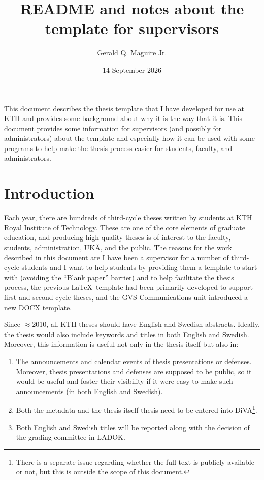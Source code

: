 \documentclass[12pt, twoside]{article}
\title{README and notes about the template for supervisors}
\author{Gerald Q. Maguire Jr.}
\date{14 September 2026}
\newcommand*{\warningExpl}[1]{\todo[inline, backgroundcolor=kth-lightred40]{#1}} %
\begin{document}
\glsresetall[]
\maketitle
{}
\warningExpl{\textbf{This document is a work in progress.}}


This document describes the thesis template that I have developed for use at \gls{KTH} and provides some background about why it is the way that it is. This document provides some information for supervisors (and possibly for administrators) about the template and especially how it can be used with some programs to help make the thesis process easier for students, faculty, and administrators.

\setcounter{page}{1}
\glsresetall
\section{Introduction}
\label{sec:IntroForSupervisors}

Each year, there are hundreds of third-cycle theses written by students at KTH Royal Institute of Technology. These are one of the core elements of graduate education, and producing high-quality theses is of interest to the faculty, students, administration, \foreignlanguage{swedish}{\gls{UKÄ}}, and the public. The reasons for the work described in this document are \first I have been a supervisor for a number of third-cycle students and I want to help students by providing them a template to start with (avoiding the \enquote{Blank paper} barrier) and to help facilitate the thesis process, \Second the previous \LaTeX~template had been primarily developed to support first and second-cycle theses, and \third the \foreignlanguage{swedish}{\gls{GVS}} Communications unit introduced a new DOCX template.

Since $\approx$2010, all KTH theses should have English and Swedish abstracts. Ideally, the thesis would also include keywords and titles in both English and Swedish. Moreover, this information is useful not only in the thesis itself but also in:
\begin{enumerate}
    \item The announcements and calendar events of thesis presentations or defenses. Moreover, thesis presentations and defenses are supposed to be public, so it would be useful and foster their visibility if it were easy to make such announcements (in both English and Swedish).
    \item Both the metadata and the thesis itself thesis need to be entered into \foreignlanguage{swedish}{\gls{DiVA}}\footnote{There is a separate issue regarding whether the full-text is publicly available or not, but this is outside the scope of this document.}.
    \item Both English and Swedish titles will be reported along with the decision of the grading committee in \foreignlanguage{swedish}{\gls{LADOK}}.
\end{enumerate}
\end{document}
